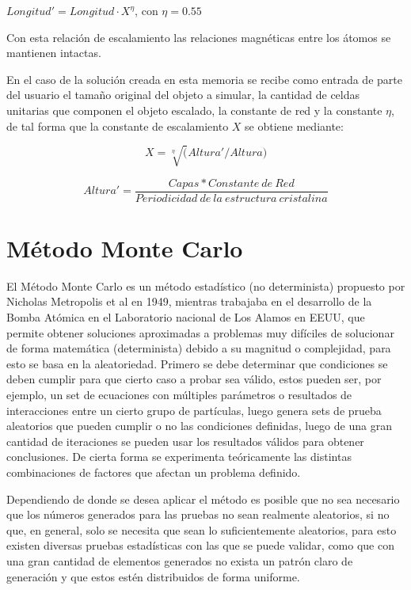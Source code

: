 \begin{center}
$Longitud' = Longitud \cdot X ^ \eta $, con $\eta = 0.55$
\end{center}

Con esta relación de escalamiento las relaciones magnéticas entre los átomos se mantienen intactas.

En el caso de la solución creada en esta memoria se recibe como entrada de parte del usuario el tamaño original del objeto a simular, la cantidad de celdas unitarias que componen el objeto escalado, la constante de red y la constante $\eta$, de tal forma que la constante de escalamiento $X$ se obtiene mediante:

\begin{center}
$$X = \sqrt[\eta](Altura' / Altura)$$

$$Altura' = \dfrac{Capas * Constante\ de\ Red}{Periodicidad\ de\ la\ estructura\ cristalina}$$
\end{center}

\clearpage

\section{Método Monte Carlo}

El Método Monte Carlo es un método estadístico (no determinista) propuesto por Nicholas Metropolis et al en 1949, mientras trabajaba en el desarrollo de la Bomba Atómica en el Laboratorio nacional de Los Alamos en EEUU, que permite obtener soluciones aproximadas a problemas muy difíciles de solucionar de forma matemática (determinista) debido a su magnitud o complejidad, para esto se basa en la aleatoriedad. Primero se debe determinar que condiciones se deben cumplir para que cierto caso a probar sea válido, estos pueden ser, por ejemplo, un set de ecuaciones con múltiples parámetros o resultados de interacciones entre un cierto grupo de partículas, luego genera sets de prueba aleatorios que pueden cumplir o no las condiciones definidas, luego de una gran cantidad de iteraciones se pueden usar los resultados válidos para obtener conclusiones. De cierta forma se experimenta teóricamente las distintas combinaciones de factores que afectan un problema definido.

Dependiendo de donde se desea aplicar el método es posible que no sea necesario que los números generados para las pruebas no sean realmente aleatorios, si no que, en general, solo se necesita que sean lo suficientemente aleatorios, para esto existen diversas pruebas estadísticas con las que se puede validar, como que con una gran cantidad de elementos generados no exista un patrón claro de generación y que estos estén distribuidos de forma uniforme.

